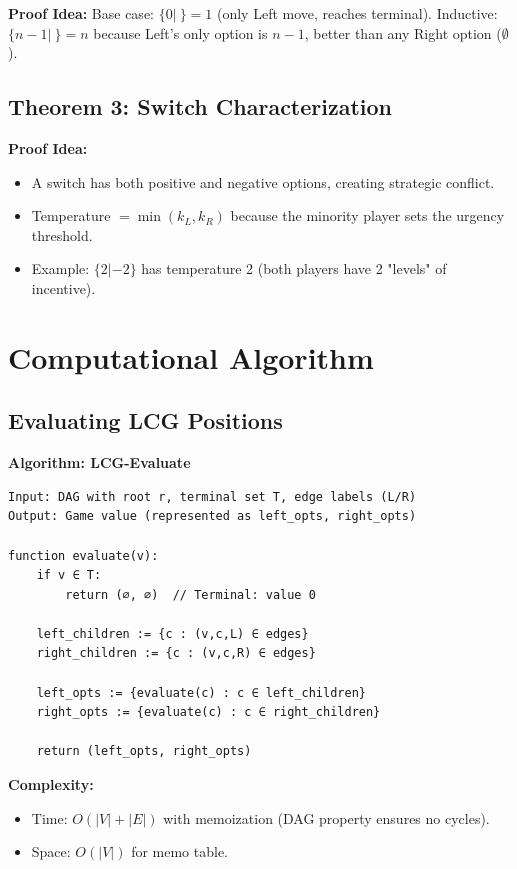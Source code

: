 \documentclass[10pt,a4paper,twocolumn]{article}
\theoremstyle{plain}
\theoremstyle{definition}
\theoremstyle{remark}
\begin{document}
\textbf{Proof Idea:} Base case: $\{0|\ \} = 1$ (only Left move, reaches terminal). Inductive: $\{n-1|\ \} = n$ because Left's only option is $n-1$, better than any Right option ($\emptyset$).

\subsection{Theorem 3: Switch Characterization}

\textbf{Proof Idea:}
\begin{itemize}
\item A switch has both positive and negative options, creating strategic conflict.
\item Temperature $= \min(k_L, k_R)$ because the minority player sets the urgency threshold.
\item Example: $\{2|-2\}$ has temperature 2 (both players have 2 "levels" of incentive).
\end{itemize}

\section{Computational Algorithm}

\subsection{Evaluating LCG Positions}

\textbf{Algorithm: LCG-Evaluate}

\begin{verbatim}
Input: DAG with root r, terminal set T, edge labels (L/R)
Output: Game value (represented as left_opts, right_opts)

function evaluate(v):
    if v ∈ T:
        return (∅, ∅)  // Terminal: value 0
    
    left_children := {c : (v,c,L) ∈ edges}
    right_children := {c : (v,c,R) ∈ edges}
    
    left_opts := {evaluate(c) : c ∈ left_children}
    right_opts := {evaluate(c) : c ∈ right_children}
    
    return (left_opts, right_opts)
\end{verbatim}

\textbf{Complexity:}
\begin{itemize}
\item Time: $O(|V| + |E|)$ with memoization (DAG property ensures no cycles).
\item Space: $O(|V|)$ for memo table.
\end{itemize}
\end{document}
